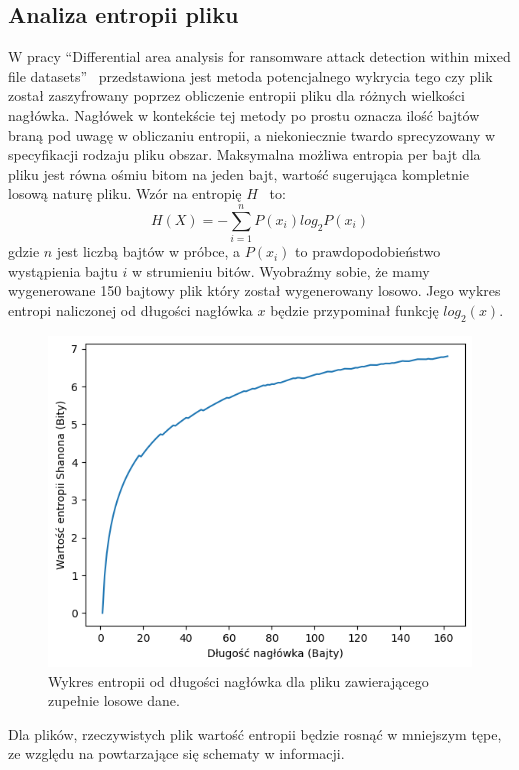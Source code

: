 \subsection{Analiza entropii pliku}
W pracy \foreignquote{english}{Differential area analysis for ransomware
attack detection within mixed file datasets}~\cite{davies_differential_2021} przedstawiona jest 
metoda potencjalnego wykrycia tego czy plik został zaszyfrowany poprzez obliczenie entropii pliku dla różnych wielkości nagłówka.
Nagłówek w kontekście tej metody po prostu oznacza ilość bajtów braną pod uwagę w obliczaniu entropii, a niekoniecznie
twardo sprecyzowany w specyfikacji rodzaju pliku obszar. Maksymalna możliwa entropia per bajt dla pliku jest równa ośmiu bitom na jeden bajt,
wartość sugerująca kompletnie losową naturę pliku. Wzór na entropię $H$~\cite{6773024} to:
$$
H(X) = - \sum_{i=1}^{n} P(x_{i})log_{2}P(x_{i})
$$
gdzie $n$ jest liczbą bajtów w próbce, a $P(x_{i})$ to prawdopodobieństwo wystąpienia bajtu $i$ w strumieniu bitów.
Wyobraźmy sobie, że mamy wygenerowane 150 bajtowy plik który został wygenerowany losowo. Jego wykres entropi naliczonej 
od długości nagłówka $x$ będzie przypominał funkcję $log_{2}(x)$.
\begin{figure}[H]
    \centering
    \includegraphics[width=0.7\linewidth]{rysunki/randomy.png}
    \caption{Wykres entropii od długości nagłówka dla pliku zawierającego zupełnie losowe dane.}
    \label{fig:enter-label}
\end{figure}
Dla plików, rzeczywistych plik wartość entropii będzie rosnąć w mniejszym tępe, ze względu na powtarzające
się schematy w informacji.
